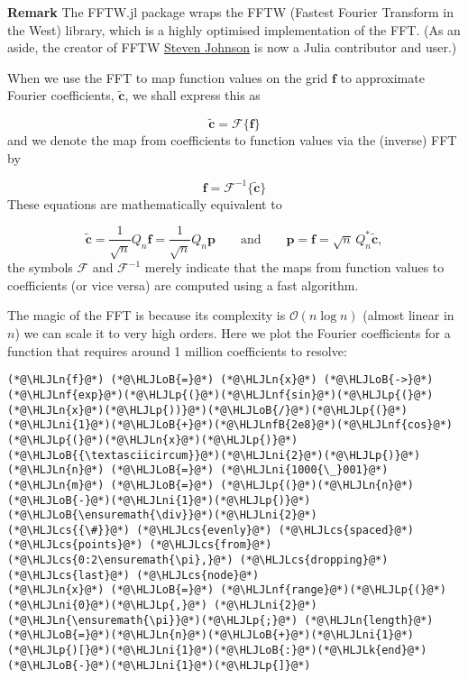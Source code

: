 \documentclass[12pt,landscape]{article}
\newcommand{\HLJLk}[1]{\textcolor[RGB]{148,91,176}{\textbf{#1}}}
\newcommand{\HLJLn}[1]{#1}
\newcommand{\HLJLnf}[1]{\textcolor[RGB]{66,102,213}{#1}}
\newcommand{\HLJLnfB}[1]{\textcolor[RGB]{59,151,46}{#1}}
\newcommand{\HLJLni}[1]{\textcolor[RGB]{59,151,46}{#1}}
\newcommand{\HLJLoB}[1]{\textcolor[RGB]{102,102,102}{\textbf{#1}}}
\newcommand{\HLJLp}[1]{#1}
\newcommand{\HLJLcs}[1]{\textcolor[RGB]{153,153,119}{\textit{#1}}}
\begin{document}
{\textbf{Remark} The FFTW.jl package wraps the FFTW (Fastest Fourier Transform in the West) library, which is a highly optimised implementation of the FFT. (As an aside, the creator of FFTW \href{https://math.mit.edu/~stevenj/}{Steven Johnson} is now a Julia contributor and user.)

When we use the FFT to map function values on the grid $\mathbf{f}$ to approximate Fourier coefficients, $\tilde{\mathbf{c}}$, we shall express this as

\[
\tilde{\mathbf{c}} = \mathcal{F}\lbrace \mathbf{f}  \rbrace
\]
and we denote the map from coefficients to function values via the (inverse) FFT by

\[
\mathbf{f}  = \mathcal{F}^{-1}\lbrace \tilde{\mathbf{c}} \rbrace
\]
These equations are mathematically equivalent to 

\[
\tilde{\mathbf{c}} =  \frac{1}{\sqrt{n}}Q_{n}\mathbf{f} =  \frac{1}{\sqrt{n}}Q_{n}\mathbf{p} \qquad \text{and} \qquad \mathbf{p} = \mathbf{f} = \sqrt{n}\,Q_{n}^*\tilde{\mathbf{c}},
\]
the symbols $\mathcal{F}$ and $\mathcal{F}^{-1}$ merely indicate that the maps from function values to coefficients (or vice versa) are computed using a fast algorithm.

The magic of the FFT is because its complexity is $\mathcal{O}(n \log n)$ (almost linear in $n$) we can scale it to very high orders. Here we plot the Fourier coefficients for a function that requires around 1 million coefficients to resolve:


\begin{lstlisting}
(*@\HLJLn{f}@*) (*@\HLJLoB{=}@*) (*@\HLJLn{x}@*) (*@\HLJLoB{->}@*) (*@\HLJLnf{exp}@*)(*@\HLJLp{(}@*)(*@\HLJLnf{sin}@*)(*@\HLJLp{(}@*)(*@\HLJLn{x}@*)(*@\HLJLp{))}@*)(*@\HLJLoB{/}@*)(*@\HLJLp{(}@*)(*@\HLJLni{1}@*)(*@\HLJLoB{+}@*)(*@\HLJLnfB{2e8}@*)(*@\HLJLnf{cos}@*)(*@\HLJLp{(}@*)(*@\HLJLn{x}@*)(*@\HLJLp{)}@*)(*@\HLJLoB{{\textasciicircum}}@*)(*@\HLJLni{2}@*)(*@\HLJLp{)}@*)
(*@\HLJLn{n}@*) (*@\HLJLoB{=}@*) (*@\HLJLni{1000{\_}001}@*)
(*@\HLJLn{m}@*) (*@\HLJLoB{=}@*) (*@\HLJLp{(}@*)(*@\HLJLn{n}@*)(*@\HLJLoB{-}@*)(*@\HLJLni{1}@*)(*@\HLJLp{)}@*)(*@\HLJLoB{\ensuremath{\div}}@*)(*@\HLJLni{2}@*)
(*@\HLJLcs{{\#}}@*) (*@\HLJLcs{evenly}@*) (*@\HLJLcs{spaced}@*) (*@\HLJLcs{points}@*) (*@\HLJLcs{from}@*) (*@\HLJLcs{0:2\ensuremath{\pi},}@*) (*@\HLJLcs{dropping}@*) (*@\HLJLcs{last}@*) (*@\HLJLcs{node}@*)
(*@\HLJLn{x}@*) (*@\HLJLoB{=}@*) (*@\HLJLnf{range}@*)(*@\HLJLp{(}@*)(*@\HLJLni{0}@*)(*@\HLJLp{,}@*) (*@\HLJLni{2}@*)(*@\HLJLn{\ensuremath{\pi}}@*)(*@\HLJLp{;}@*) (*@\HLJLn{length}@*)(*@\HLJLoB{=}@*)(*@\HLJLn{n}@*)(*@\HLJLoB{+}@*)(*@\HLJLni{1}@*)(*@\HLJLp{)[}@*)(*@\HLJLni{1}@*)(*@\HLJLoB{:}@*)(*@\HLJLk{end}@*)(*@\HLJLoB{-}@*)(*@\HLJLni{1}@*)(*@\HLJLp{]}@*)


\end{lstlisting}}
\end{document}
